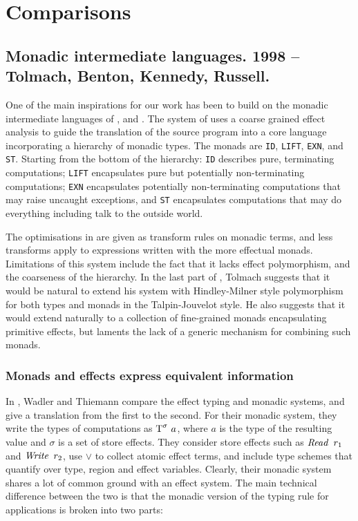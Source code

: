 \section{Comparisons}

\subsection{Monadic intermediate languages. 1998 --\\
	 Tolmach, Benton, Kennedy, Russell.}
\label{Core:Comparisons:monadic-intermediate-languages}
One of the main inspirations for our work has been to build on the monadic intermediate languages of \cite{tolmach:optimizing-ml}, \cite{benton:monads-effects-transformations} and \cite{peyton-jones:bridging-the-gulf}. The system of \cite{tolmach:optimizing-ml} uses a coarse grained effect analysis to guide the translation of the source program into a core language incorporating a hierarchy of monadic types. The monads are \texttt{ID}, \texttt{LIFT}, \texttt{EXN}, and \texttt{ST}. Starting from the bottom of the hierarchy: \texttt{ID} describes pure, terminating computations; \texttt{LIFT} encapsulates pure but potentially non-terminating computations; \texttt{EXN} encapsulates potentially non-terminating computations that may raise uncaught exceptions, and \texttt{ST} encapsulates computations that may do everything including talk to the outside world.

The optimisations in \cite{tolmach:optimizing-ml} are given as transform rules on monadic terms, and less transforms apply to expressions written with the more effectual monads. Limitations of this system include the fact that it lacks effect polymorphism, and the coarseness of the hierarchy. In the last part of \cite{tolmach:optimizing-ml}, Tolmach suggests that it would be natural to extend his system with Hindley-Milner style polymorphism for both types and monads in the Talpin-Jouvelot style. He also suggests that it would extend naturally to a collection of fine-grained monads encapsulating primitive effects, but laments the lack of a generic mechanism for combining such monads. 

\subsubsection{Monads and effects express equivalent information}
In \cite{wadler:marriage-2003}, Wadler and Thiemann compare the effect typing and monadic systems, and give a translation from the first to the second. For their monadic system, they write the types of computations as $\textrm{T}^\sigma \ a$, where $a$ is the type of the resulting value and $\sigma$ is a set of store effects. They consider store effects such as $\operatorname{\mathit{Read}} \ r_1$ and $\operatorname{\mathit{Write}} \ r_2$, use $\lor$ to collect atomic effect terms, and include type schemes that quantify over type, region and effect variables. Clearly, their monadic system shares a lot of common ground with an effect system. The main technical difference between the two is that the monadic version of the typing rule for applications is broken into two parts:

